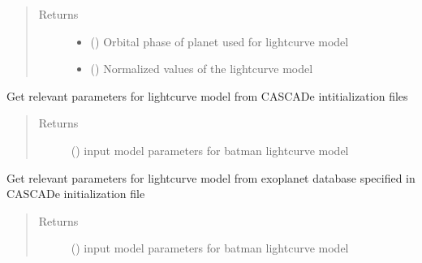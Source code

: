 \documentclass[a4paper,10pt,english]{sphinxmanual}
\begin{document}
\begin{fulllineitems}
\begin{fulllineitems}
\begin{quote}
\begin{description}
\item[{Returns}] \leavevmode
\begin{itemize}
\item {} 
 () \textendash{} Orbital phase of planet used for lightcurve model

\item {} 
 () \textendash{} Normalized values of the lightcurve model

\end{itemize}


\end{description}\end{quote}

\end{fulllineitems}


\begin{fulllineitems}
\label{\detokenize{cascade.exoplanet_tools:cascade.exoplanet_tools.exoplanet_tools.batman_model.ReturnParFromIni}}
Get relevant parameters for lightcurve model from CASCADe
intitialization files
\begin{quote}\begin{description}
\item[{Returns}] \leavevmode
{} () \textendash{} input model parameters for batman lightcurve model

\end{description}\end{quote}

\end{fulllineitems}


\begin{fulllineitems}
\label{\detokenize{cascade.exoplanet_tools:cascade.exoplanet_tools.exoplanet_tools.batman_model.ReturnParFromDB}}
Get relevant parameters for lightcurve model from exoplanet database
specified in CASCADe initialization file
\begin{quote}\begin{description}
\item[{Returns}] \leavevmode
{} () \textendash{} input model parameters for batman lightcurve model


\end{description}
\end{quote}
\end{fulllineitems}
\end{fulllineitems}
\end{document}
